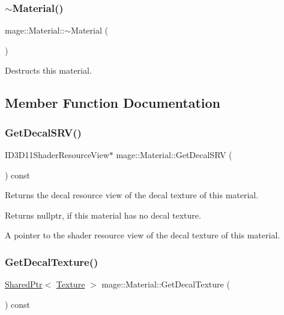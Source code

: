 \subsubsection{\texorpdfstring{$\sim$\+Material()}{~Material()}}
{\footnotesize\ttfamily mage\+::\+Material\+::$\sim$\+Material (\begin{DoxyParamCaption}{ }\end{DoxyParamCaption})\hspace{0.3cm}{\ttfamily [default]}}

Destructs this material. 

\subsection{Member Function Documentation}
\hypertarget{structmage_1_1_material_a8d189673acfe8d0c104873fe0cceb601}{}\label{structmage_1_1_material_a8d189673acfe8d0c104873fe0cceb601} 
\subsubsection{\texorpdfstring{Get\+Decal\+S\+R\+V()}{GetDecalSRV()}}
{\footnotesize\ttfamily I\+D3\+D11\+Shader\+Resource\+View$\ast$ mage\+::\+Material\+::\+Get\+Decal\+S\+RV (\begin{DoxyParamCaption}{ }\end{DoxyParamCaption}) const\hspace{0.3cm}{\ttfamily [noexcept]}}

Returns the decal resource view of the decal texture of this material.

\begin{DoxyReturn}{Returns}
{\ttfamily nullptr}, if this material has no decal texture. 

A pointer to the shader resource view of the decal texture of this material. 
\end{DoxyReturn}
\hypertarget{structmage_1_1_material_a7cf62e3f72b74c945e3d5c47c2c73485}{}\label{structmage_1_1_material_a7cf62e3f72b74c945e3d5c47c2c73485} 
\subsubsection{\texorpdfstring{Get\+Decal\+Texture()}{GetDecalTexture()}}
{\footnotesize\ttfamily \hyperlink{namespacemage_a1e01ae66713838a7a67d30e44c67703e}{Shared\+Ptr}$<$ \hyperlink{classmage_1_1_texture}{Texture} $>$ mage\+::\+Material\+::\+Get\+Decal\+Texture (\begin{DoxyParamCaption}{ }\end{DoxyParamCaption}) const\hspace{0.3cm}{\ttfamily [noexcept]}}

